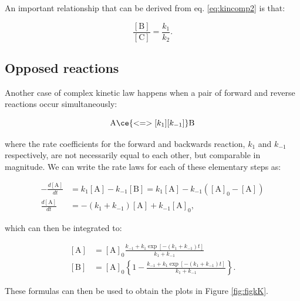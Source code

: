 \documentclass[
  9pt,
]{extbook}
\theoremstyle{definition}
\theoremstyle{definition}
\theoremstyle{definition}
\theoremstyle{remark}
\begin{document}
An important relationship that can be derived from eq. \eqref{eq:kincomp2} is that:

\begin{equation}
\frac{[\mathrm{B}]}{[\mathrm{C}]} =\frac{k_1}{k_2}.
\label{eq:kincomp3}
\end{equation}

\hypertarget{opposed-reactions}{%
\subsection{Opposed reactions}\label{opposed-reactions}}

Another case of complex kinetic law happens when a pair of forward and reverse reactions occur simultaneously:

\begin{equation}
\mathrm{A}\ce{<=>[k_1][k_{-1}]}\mathrm{B}
\end{equation}

where the rate coefficients for the forward and backwards reaction, \(k_1\) and \(k_{-1}\) respectively, are not necessarily equal to each other, but comparable in magnitude. We can write the rate laws for each of these elementary steps as:

\begin{equation}
\begin{aligned}
-\frac{d[\mathrm{A}]}{dt} &=k_1 [\mathrm{A}]-k_{-1} [\mathrm{B}] = k_1 [\mathrm{A}]-k_{-1}\left([\mathrm{A}]_0-[\mathrm{A}]\right) \\
\frac{d[\mathrm{A}]}{dt} &=-(k_1+k_{-1})[\mathrm{A}] + k_{-1}[\mathrm{A}]_0,
\end{aligned}
\label{eq:kinopp1}
\end{equation}

which can then be integrated to:

\begin{equation}
\begin{aligned}
\left[\mathrm{A}\right] &=[\mathrm{A}]_0\frac{k_{-1}+k_1\exp[-(k_1+k_{-1})t]}{k_1+k_{-1}} \\
\left[\mathrm{B}\right] &=[\mathrm{A}]_0\left\{ 1-\frac{k_{-1}+k_1\exp[-(k_1+k_{-1})t]}{k_1+k_{-1}}\right\}.
\end{aligned}
\label{eq:kinopp2}
\end{equation}

These formulas can then be used to obtain the plots in Figure \ref{fig:figkK}.
\end{document}
